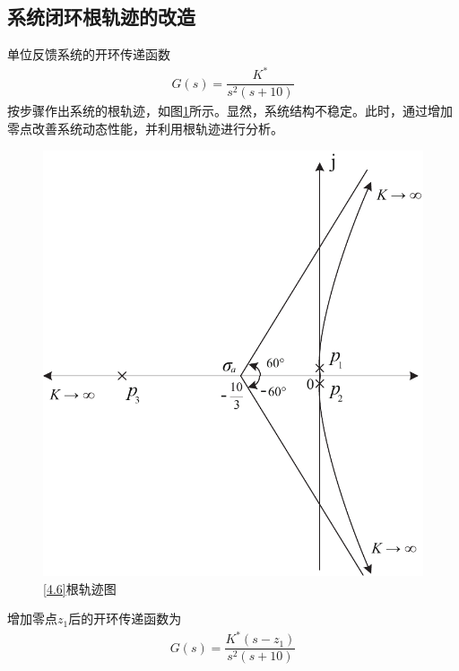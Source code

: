 \subsection{系统闭环根轨迹的改造}
\vspace*{-1em}
\examples \label{4.6}单位反馈系统的开环传递函数
\begin{align*}
	G(s) = \dfrac{K^*}{s^2(s+10)}
\end{align*}
按步骤作出系统的根轨迹，如图\ref{F4.6.1}所示。显然，系统结构不稳定。此时，通过增加零点改善系统动态性能，并利用根轨迹进行分析。
\begin{figure}[!htb]
	\centering
	\includegraphics[width=0.4\linewidth]{pic/4.6.1.pdf}
	\caption{\ref{4.6}根轨迹图}
	\label{F4.6.1}
\end{figure}

增加零点$z_1$后的开环传递函数为
\begin{align*}
	G(s) = \dfrac{K^*(s - z_1)}{s^2(s+10)}
\end{align*}


